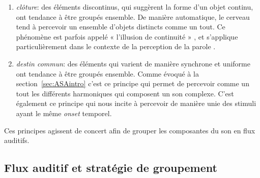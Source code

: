 \begin{enumerate}
\item \emph{clôture}: des éléments discontinus, qui suggèrent la forme d'un objet continu, ont tendance à être groupés ensemble. De manière automatique, le cerveau tend à percevoir un ensemble d'objets distincts comme un tout.  Ce phénomène est parfois appelé « l’illusion de continuité » \citep{dannenbring1976perceived}, et s'applique particulièrement dans le contexte de la perception de la parole \citep{carlyon2002continuity}.
\item \emph{destin commun}: des éléments qui varient de manière synchrone et uniforme ont tendance à être groupés ensemble. Comme évoqué à la section~\ref{sec:ASAintro} c'est ce principe qui permet de percevoir comme un tout les différents harmoniques qui composent un son complexe. C'est également ce principe qui nous incite à percevoir de manière unie des stimuli ayant le même \emph{onset} temporel.
\end{enumerate}

Ces principes agissent de concert afin de grouper les composantes du son en flux auditifs.

\subsection{Flux auditif et stratégie de groupement}
\label{sec:ch3_asaFlux}

